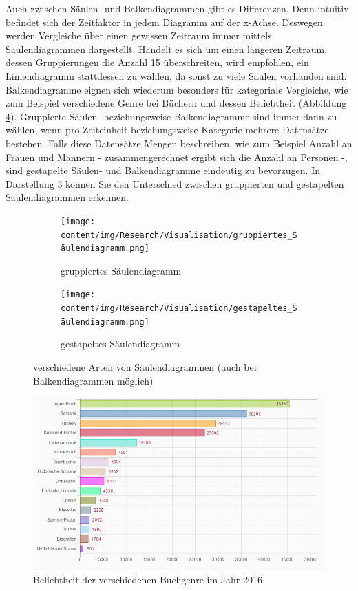 Auch zwischen Säulen- und Balkendiagrammen gibt es Differenzen. Denn intuitiv befindet sich der Zeitfaktor in jedem Diagramm auf der x-Achse. Deswegen werden Vergleiche über einen gewissen Zeitraum immer mittels Säulendiagrammen dargestellt. Handelt es sich um einen längeren Zeitraum, dessen Gruppierungen die Anzahl 15 überschreiten, wird empfohlen, ein Liniendiagramm stattdessen zu wählen, da sonst zu viele Säulen vorhanden sind. Balkendiagramme eignen sich wiederum besonders für kategoriale Vergleiche, wie zum Beispiel verschiedene Genre bei Büchern und dessen Beliebtheit (Abbildung \ref{fig:GenreBuecherBeliebtheit}). Gruppierte Säulen- beziehungsweise Balkendiagramme sind immer dann zu wählen, wenn pro Zeiteinheit beziehungsweise Kategorie mehrere Datensätze bestehen. Falls diese Datensätze Mengen beschreiben, wie zum Beispiel Anzahl an Frauen und Männern - zusammengerechnet ergibt sich die Anzahl an Personen -, sind gestapelte Säulen- und Balkendiagramme eindeutig zu bevorzugen. In Darstellung \ref{fig:differentCharts} können Sie den Unterschied zwischen gruppierten und gestapelten Säulendiagrammen erkennen. \cite{marktler2020diagrammtypen}

\begin{figure}
    \centering
    \begin{subfigure}{.5\textwidth}
        \centering
        \texttt{[image: content/img/Research/Visualisation/gruppiertes\_Säulendiagramm.png]}
        \caption{gruppiertes Säulendiagramm \cite{groupedChart}}
        \label{fig:groupedChart}
    \end{subfigure}%
    \begin{subfigure}{.5\textwidth}
        \centering
        \texttt{[image: content/img/Research/Visualisation/gestapeltes\_Säulendiagramm.png]}
        \caption{gestapeltes Säulendiagramm \cite{stackedChart}}
        \label{fig:stackedChart}
    \end{subfigure}
    \caption{verschiedene Arten von Säulendiagrammen (auch bei Balkendiagrammen möglich)}
    \label{fig:differentCharts}
\end{figure}
\FloatBarrier

\begin{figure}
    \centering
    \includegraphics[width=1\textwidth]{content/img/Research/Visualisation/genres.jpg}
    \caption{Beliebtheit der verschiedenen Buchgenre im Jahr 2016 \cite{zeising2016genre}}
    \label{fig:GenreBuecherBeliebtheit}
\end{figure}
\FloatBarrier

